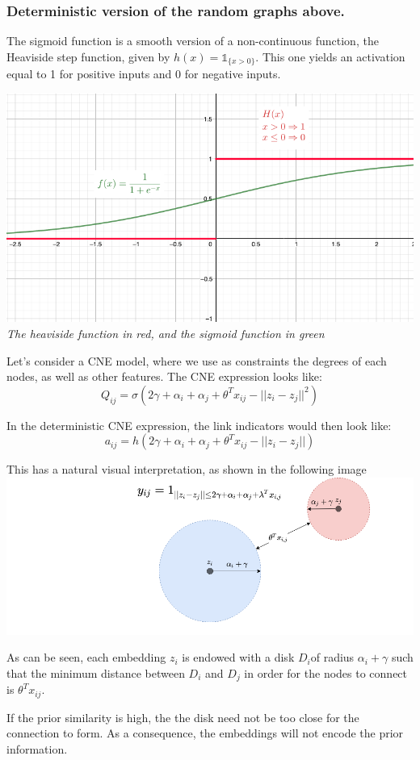 \hypertarget{deterministic-version-of-the-random-graphs-above.}{%
\subsubsection{Deterministic version of the random graphs
above.}\label{deterministic-version-of-the-random-graphs-above.}}

The sigmoid function is a smooth version of a non-continuous function,
the Heaviside step function, given by \(h(x) = \mathbb{1}_{\{x>0\}}\).
This one yields an activation equal to 1 for positive inputs and 0 for
negative inputs.

\includegraphics{figures/sigmoid_vs_heaviside.png} \emph{The heaviside
function in red, and the sigmoid function in green}

Let's consider a CNE model, where we use as constraints the degrees of
each nodes, as well as other features. The CNE expression looks like: \[
Q_{ij} = \sigma \left(2 \gamma +\alpha_i + \alpha_j+  \theta^T x_{ij} - ||z_i-z_j||^2 \right)
\]

In the deterministic CNE expression, the link indicators would then look
like:
\[a_{ij} =h\left(2\gamma +\alpha_i + \alpha_j+  \theta^Tx_{ij} - ||z_i-z_j|| \right)
\]

This has a natural visual interpretation, as shown in the following
image \includegraphics{figures/cne_deg1.png}

As can be seen, each embedding \(z_i\) is endowed with a disk \(D_i\)of
radius \(\alpha_i+\gamma\) such that the minimum distance between
\(D_i\) and \(D_j\) in order for the nodes to connect is
\(\theta^T x_{ij}\).

If the prior similarity is high, the the disk need not be too close for
the connection to form. As a consequence, the embeddings will not encode
the prior information.
